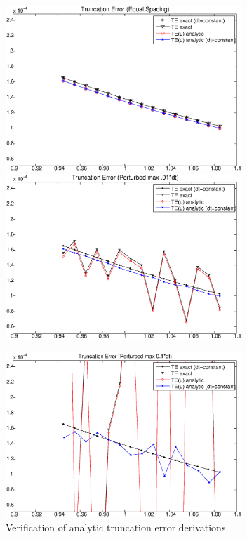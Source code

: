 \documentclass[10pt]{article}%
\begin{document}
\begin{figure}[H]
  \begin{minipage}{0.5\textwidth}
    \centering
    \includegraphics[width=3.5in]{TE_ex_vs_anytc_equalspacing}
  \end{minipage}
  \hfill
  \begin{minipage}{0.5\textwidth}
    \centering
    \includegraphics[width=3.5in]{TE_ex_vs_anytc_01}
  \end{minipage}
\end{figure}
\begin{figure}[H]
    \centering
    \includegraphics[width=3.5in]{TE_ex_vs_anytc_1}
    \caption{Verification of analytic truncation error derivations}
\end{figure}
\end{document}
